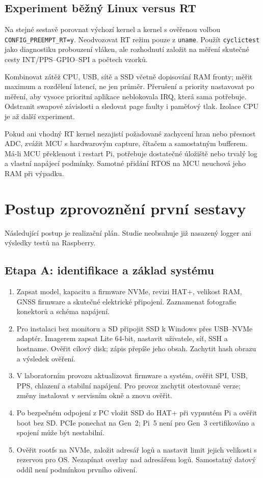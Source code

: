 \documentclass[11pt,a4paper]{article}
\newcommand{\novastrana}{\clearpage}
\begin{document}
\subsection{Experiment běžný Linux versus RT}
Na stejné sestavě porovnat výchozí kernel a kernel s ověřenou volbou \texttt{CONFIG\_PREEMPT\_RT=y}. Neodvozovat RT režim pouze z \texttt{uname}. Použít \texttt{cyclictest} jako diagnostiku probouzení vláken, ale rozhodnutí založit na měření skutečné cesty INT/PPS--GPIO--SPI a počtech vzorků.\cite{rt,cyclic}

Kombinovat zátěž CPU, USB, sítě a SSD včetně dopisování RAM fronty; měřit maximum a rozdělení latencí, ne jen průměr. Přerušení a priority nastavovat po měření, aby vysoce prioritní aplikace neblokovala IRQ, která sama potřebuje. Odstranit swapové závislosti a sledovat page faulty i paměťový tlak. Izolace CPU je až další experiment.

Pokud ani vhodný RT kernel nezajistí požadované zachycení hran nebo přesnost ADC, zvážit MCU s hardwarovým capture, čítačem a samostatným bufferem. Má-li MCU překlenout i restart Pi, potřebuje dostatečné úložiště nebo trvalý log a vlastní napájecí podmínky. Samotné přidání RTOS na MCU neuchová jeho RAM při výpadku.

\novastrana
\section{Postup zprovoznění první sestavy}
Následující postup je realizační plán. Studie neobsahuje již nasazený logger ani výsledky testů na Raspberry.

\subsection{Etapa A: identifikace a základ systému}
\begin{enumerate}
\item Zapsat model, kapacitu a firmware NVMe, revizi HAT+, velikost RAM, GNSS firmware a skutečné elektrické připojení. Zaznamenat fotografie konektorů a schéma napájení.
\item Pro instalaci bez monitoru a SD připojit SSD k Windows přes USB--NVMe adaptér. Imagerem zapsat Lite 64-bit, nastavit uživatele, síť, SSH a hostname. Ověřit cílový disk; zápis přepíše jeho obsah. Zachytit hash obrazu a výsledek ověření.
\item V laboratorním provozu aktualizovat firmware a systém, ověřit SPI, USB, PPS, chlazení a stabilní napájení. Pro provoz zachytit otestované verze; změny instalovat v servisním okně a znovu ověřit.
\item Po bezpečném odpojení z PC vložit SSD do HAT+ při vypnutém Pi a ověřit boot bez SD. PCIe ponechat na Gen~2; Pi~5 není pro Gen~3 certifikováno a spojení může být nestabilní.\cite{pihw}
\item Ověřit rootfs na NVMe, založit adresář logů a nastavit limit jejich velikosti s rezervou pro OS. Nezapínat overlay nad adresářem logů. Samostatný datový oddíl není podmínkou prvního oživení.
\end{enumerate}
\end{document}
